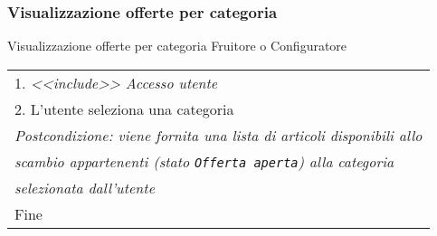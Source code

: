 \begin{minipage}{\textwidth}
    \subsubsection{Visualizzazione offerte per categoria}
    \usecase
        {Visualizzazione offerte per categoria}
        {
            Fruitore o Configuratore %
        }
        {
            \begin{tabular}{l}
                1. \textit{<<include>> Accesso utente}\\
                2. L'utente seleziona una categoria\\
                \textit{Postcondizione: viene fornita una lista di articoli disponibili allo}\\
                \textit{scambio appartenenti (stato \texttt{Offerta aperta}) alla categoria}\\
                \textit{selezionata dall'utente}\\
                Fine
            \end{tabular}\\

            \\


        }
        \vspace{0.5cm}
\end{minipage}